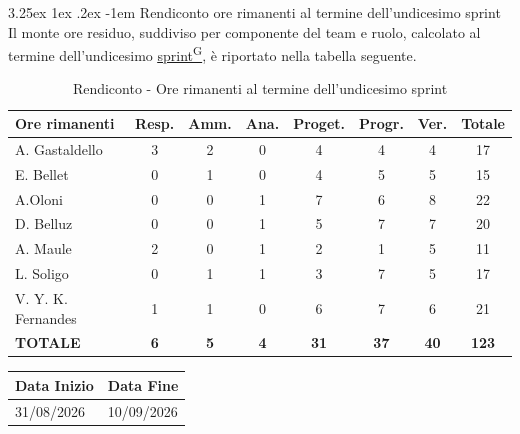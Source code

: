 \documentclass[a4paper,12pt]{article}
\makeatletter
\newcounter{subsubsubsection}[subsubsection]
\renewcommand\paragraph{\@startsection{paragraph}{5}{\z@}%
  {3.25ex \@plus1ex \@minus.2ex}%
  {-1em}%
  {\normalfont\normalsize\bfseries}}
\providecommand{\glslink}[2]{\href{https://alittlebyte-19.github.io/Documentazione/glossario.html\#gls-#1}{\underline{#2}\textsuperscript{\scriptsize G}}}
\makeatother
\begin{document}
\paragraph{Rendiconto ore rimanenti al termine dell'undicesimo sprint}
Il monte ore residuo, suddiviso per componente del team e ruolo, calcolato al termine dell'undicesimo \glslink{sprint}{sprint}, è riportato nella tabella seguente.
\begin{table}[htbp]
\centering
\renewcommand{\arraystretch}{1.5}
\begin{tabularx}{\textwidth}{|X|c|c|c|c|c|c|c|}
\hline
\textbf{Ore rimanenti} & \textbf{Resp.} & \textbf{Amm.} & \textbf{Ana.} & \textbf{Proget.} & \textbf{Progr.} & \textbf{Ver.} & \textbf{Totale} \\
\hline
A. Gastaldello & 3 & 2 & 0 & 4 & 4 & 4 & 17 \\
\hline
E. Bellet & 0 & 1 & 0 & 4 & 5 & 5 & 15 \\
\hline
A.Oloni & 0 & 0 & 1 & 7 & 6 & 8 & 22 \\
\hline
D. Belluz & 0 & 0 & 1 & 5 & 7 & 7 & 20 \\
\hline
A. Maule & 2 & 0 & 1 & 2 & 1 & 5 & 11 \\
\hline
L. Soligo & 0 & 1 & 1 & 3 & 7 & 5 & 17 \\
\hline
V. Y. K. Fernandes & 1 & 1 & 0 & 6 & 7 & 6 & 21 \\
\hline
\rowcolor{gray!20}
\textbf{TOTALE} & \textbf{6} & \textbf{5} & \textbf{4} & \textbf{31} & \textbf{37} & \textbf{40} & \textbf{123} \\
\hline
\end{tabularx}
\caption{Rendiconto - Ore rimanenti al termine dell'undicesimo sprint}
\end{table}


\newpage


\label{sec:pb_dodicesimoperiodo}
\begin{table}[H]
    \centering
    \renewcommand{\arraystretch}{1.5}
    \begin{tabularx}{\textwidth}{|X|X|}
    \hline \rowcolor{Dandelion!50}
    \textbf{Data Inizio} & \textbf{Data Fine}\\
    \hline
    31/08/2026 & 10/09/2026\\
    \hline

    \end{tabularx}
\end{table}
\end{document}
